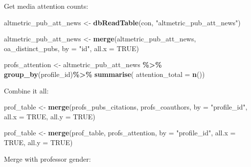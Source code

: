 \documentclass[
]{article}
\newenvironment{Shaded}{\begin{snugshade}}{\end{snugshade}}
\newcommand{\AttributeTok}[1]{\textcolor[rgb]{0.13,0.29,0.53}{#1}}
\newcommand{\ConstantTok}[1]{\textcolor[rgb]{0.56,0.35,0.01}{#1}}
\newcommand{\FunctionTok}[1]{\textcolor[rgb]{0.13,0.29,0.53}{\textbf{#1}}}
\newcommand{\NormalTok}[1]{#1}
\newcommand{\OtherTok}[1]{\textcolor[rgb]{0.56,0.35,0.01}{#1}}
\newcommand{\SpecialCharTok}[1]{\textcolor[rgb]{0.81,0.36,0.00}{\textbf{#1}}}
\newcommand{\StringTok}[1]{\textcolor[rgb]{0.31,0.60,0.02}{#1}}
\begin{document}
Get media attention counts:

\begin{Shaded}
\begin{Highlighting}[]
\NormalTok{altmetric\_pub\_att\_news }\OtherTok{\textless{}{-}} \FunctionTok{dbReadTable}\NormalTok{(con, }\StringTok{"altmetric\_pub\_att\_news"}\NormalTok{)}

\NormalTok{altmetric\_pub\_att\_news }\OtherTok{\textless{}{-}} \FunctionTok{merge}\NormalTok{(altmetric\_pub\_att\_news,}
\NormalTok{                                oa\_distinct\_pubs, }
                                \AttributeTok{by =} \StringTok{"id"}\NormalTok{,}
                                \AttributeTok{all.x =} \ConstantTok{TRUE}\NormalTok{)}

\NormalTok{profs\_attention }\OtherTok{\textless{}{-}}\NormalTok{ altmetric\_pub\_att\_news }\SpecialCharTok{\%\textgreater{}\%}
  \FunctionTok{group\_by}\NormalTok{(profile\_id)}\SpecialCharTok{\%\textgreater{}\%}
  \FunctionTok{summarise}\NormalTok{(}
    \AttributeTok{attention\_total =} \FunctionTok{n}\NormalTok{())}
\end{Highlighting}
\end{Shaded}

Combine it all:

\begin{Shaded}
\begin{Highlighting}[]
\NormalTok{prof\_table }\OtherTok{\textless{}{-}} \FunctionTok{merge}\NormalTok{(profs\_pubs\_citations,}
\NormalTok{                    profs\_coauthors,}
                    \AttributeTok{by =} \StringTok{"profile\_id"}\NormalTok{,}
                    \AttributeTok{all.x =} \ConstantTok{TRUE}\NormalTok{,}
                    \AttributeTok{all.y =} \ConstantTok{TRUE}\NormalTok{)}

\NormalTok{prof\_table }\OtherTok{\textless{}{-}} \FunctionTok{merge}\NormalTok{(prof\_table,}
\NormalTok{                    profs\_attention,}
                    \AttributeTok{by =} \StringTok{"profile\_id"}\NormalTok{,}
                    \AttributeTok{all.x =} \ConstantTok{TRUE}\NormalTok{,}
                    \AttributeTok{all.y =} \ConstantTok{TRUE}\NormalTok{)}
\end{Highlighting}
\end{Shaded}

Merge with professor gender:
\end{document}
